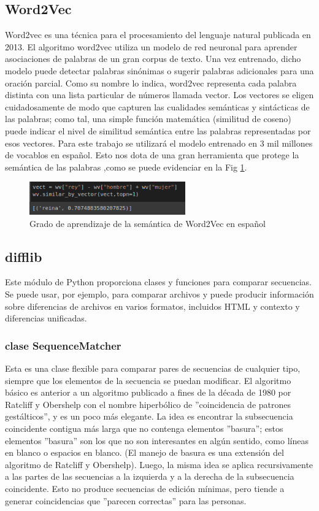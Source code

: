 \subsection{Word2Vec}
Word2vec es una técnica para el procesamiento del lenguaje natural publicada en 2013. El algoritmo word2vec utiliza un modelo de red neuronal para aprender asociaciones de palabras de un gran corpus de texto. Una vez entrenado, dicho modelo puede detectar palabras sinónimas o sugerir palabras adicionales para una oración parcial. Como su nombre lo indica, word2vec representa cada palabra distinta con una lista particular de números llamada vector. Los vectores se eligen cuidadosamente de modo que capturen las cualidades semánticas y sintácticas de las palabras; como tal, una simple función matemática (similitud de coseno) puede indicar el nivel de similitud semántica entre las palabras representadas por esos vectores.
Para este trabajo se utilizará el modelo entrenado en 3 mil millones de vocablos en español. Esto nos dota de una gran herramienta que protege la semántica de las palabras ,como se puede evidenciar en la Fig \ref{fig:word2vec}.

\begin{figure}[ht!]
    \centering
    \includegraphics[width=0.6\textwidth]{Graphics/word2vec.png}
    \caption{Grado de aprendizaje de la semántica de Word2Vec en español}
    \label{fig:word2vec}
\end{figure}


\subsection{difflib}
Este módulo de Python proporciona clases y funciones para comparar secuencias. Se puede usar, por ejemplo, para comparar archivos y puede producir información sobre diferencias de archivos en varios formatos, incluidos HTML y contexto y diferencias unificadas.

 \subsubsection{clase SequenceMatcher}
 Esta es una clase flexible para comparar pares de secuencias de cualquier tipo, siempre que los elementos de la secuencia se puedan modificar. El algoritmo básico es anterior a un algoritmo publicado a fines de la década de 1980 por Ratcliff y Obershelp con el nombre hiperbólico de ''coincidencia de patrones gestálticos'', y es un poco más elegante. La idea es encontrar la subsecuencia coincidente contigua más larga que no contenga elementos ''basura''; estos elementos ''basura'' son los que no son interesantes en algún sentido, como líneas en blanco o espacios en blanco. (El manejo de basura es una extensión del algoritmo de Ratcliff y Obershelp). Luego, la misma idea se aplica recursivamente a las partes de las secuencias a la izquierda y a la derecha de la subsecuencia coincidente. Esto no produce secuencias de edición mínimas, pero tiende a generar coincidencias que ''parecen correctas'' para las personas.
